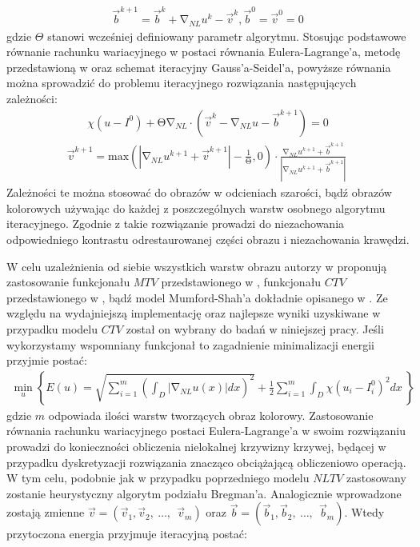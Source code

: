 \documentclass[12pt, twoside, openany]{report}
\theoremstyle{definition}
\begin{document}
\begin{align}
{\overrightarrow{b}}^{k+1}={\overrightarrow{b}}^k+{\mathrm{\nabla }}_{NL}u^k-{\overrightarrow{v}}^k, {\overrightarrow{b}}^0={\overrightarrow{v}}^0=0
\label{BREGMANVARIABLE}
\end{align}
gdzie $\Theta$ stanowi wcześniej definiowany parametr algorytmu. Stosując podstawowe równanie rachunku wariacyjnego w postaci równania Eulera-Lagrange’a, metodę przedstawioną w \cite{tai2011fast} oraz schemat iteracyjny Gauss’a-Seidel’a, powyższe równania można sprowadzić do problemu iteracyjnego rozwiązania następujących zależności:
\begin{align}
\chi \left(u-I^0\right)+\mathrm{\Theta }{\mathrm{\nabla }}_{NL}\cdot \left({\overrightarrow{v}}^k-{\mathrm{\nabla }}_{NL}u-{\overrightarrow{b}}^{k+1}\right)=0
\label{ELNLTV1}
\end{align}
\begin{align}
{\overrightarrow{v}}^{k+1}\mathrm{=}{\mathrm{max} \left(\left|{\mathrm{\nabla }}_{NL}u^{k+1}+{\overrightarrow{v}}^{k+1}\right|-\frac{1}{\mathrm{\Theta }},0\right)\cdot\frac{{\mathrm{\nabla }}_{NL}u^{k+1}+{\overrightarrow{b}}^{k+1}}{\left|{\mathrm{\nabla }}_{NL}u^{k+1}+{\overrightarrow{b}}^{k+1}\right|}\ }
\label{ELNLTV2}
\end{align}
Zależności te można stosować do obrazów w odcieniach szarości, bądź obrazów kolorowych używając do  każdej z poszczególnych warstw osobnego algorytmu iteracyjnego. Zgodnie z \cite{duan2015fast} takie rozwiązanie prowadzi do niezachowania odpowiedniego kontrastu odrestaurowanej części obrazu i niezachowania krawędzi.
\par
W celu uzależnienia od siebie wszystkich warstw obrazu autorzy w \cite{duan2015fast} proponują zastosowanie funkcjonału $MTV$ przedstawionego w \cite{yang2009fast}, funkcjonału $CTV$ przedstawionego w \cite{blomgren1998color}, bądź model Mumford-Shah’a dokładnie opisanego w \cite{jung2011nonlocal}. Ze względu na wydajniejszą implementację oraz najlepsze wyniki uzyskiwane w przypadku modelu \textbf{$CTV$} został on wybrany do badań w niniejszej pracy. Jeśli wykorzystamy wspomniany funkcjonał to zagadnienie minimalizacji energii przyjmie postać:
\begin{align}
{\mathop{\mathrm{min}}_{u} \left\{E\left(u\right)=\sqrt{\sum^m_{i=1}{{\left(\int_D{\left|{\mathrm{\nabla }}_{NL}u(x)\right|}dx\right)}^2}}+\frac{1}{2}\sum^m_{i=1}{\int_D{\chi{\left(u_i-I^0_i\right)}^2}dx}\ \right\}\ }
\label{ENLCTV}
\end{align}
gdzie $m$ odpowiada ilości warstw tworzących obraz kolorowy. Zastosowanie równania rachunku wariacyjnego postaci Eulera-Lagrange’a w swoim rozwiązaniu prowadzi do konieczności obliczenia nielokalnej krzywizny krzywej, będącej w przypadku dyskretyzacji rozwiązania znacząco obciążającą obliczeniowo operacją. W tym celu, podobnie jak w przypadku poprzedniego modelu $NLTV$ zastosowany zostanie heurystyczny algorytm podziału Bregman’a. Analogicznie wprowadzone zostają zmienne $\overrightarrow{v}=\left({\overrightarrow{v}}_1,{\overrightarrow{v}}_2,\ \dots ,\ \ {\overrightarrow{v}}_m\right)$ oraz $\overrightarrow{b}=\left({\overrightarrow{b}}_1,{\overrightarrow{b}}_2,\ \dots ,\ \ {\overrightarrow{b}}_m\right)$. Wtedy przytoczona energia przyjmuje iteracyjną postać: 
\end{document}
